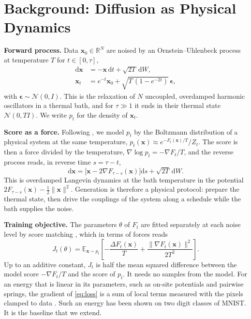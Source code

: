 \documentclass{article}
\newif\ifshownotes
\newcommand{\budget}[1]{\ifshownotes{\noindent\small\itshape\textcolor{notegray}{[Budget: #1]}\par}\fi}
\newcommand{\x}{\bm{x}}
\newcommand{\dd}{\mathrm{d}}
\begin{document}
\section{Background: Diffusion as Physical Dynamics}
\label{sec:background}
\budget{0.5 page}

\textbf{Forward process.}
Data $\x_0\in\mathbb{R}^{N}$ are noised by an Ornstein--Uhlenbeck process at
temperature $T$ for $t\in[0,\tau]$,
\begin{align}
  \dd\x &= -\x\,\dd t + \sqrt{2T}\,\dd W , \nonumber\\
  \x_t &= e^{-t}\x_0 + \sqrt{T\,(1-e^{-2t})}\,\bm{\epsilon} ,
  \label{eq:forward}
\end{align}
with $\bm{\epsilon}\sim\mathcal{N}(0,I)$. This is the relaxation of $N$
uncoupled, overdamped harmonic oscillators in a thermal bath, and for
$\tau\gg1$ it ends in their thermal state $\mathcal{N}(0,TI)$. We write $p_t$
for the density of $\x_t$.

\textbf{Score as a force.}
Following \citet{firstpaper2025}, we model $p_t$ by the Boltzmann distribution
of a physical system at the same temperature,
$p_t(\x)\approx e^{-F_t(\x)/T}/Z_t$. The score is then a force divided by the
temperature, $\nabla\log p_t=-\nabla F_t/T$, and the reverse process
\citep{song2021score} reads, in reverse time $s=\tau-t$,
\begin{equation}
  \dd\x = \bigl[\x - 2\nabla F_{\tau-s}(\x)\bigr]\dd s + \sqrt{2T}\,\dd W .
  \label{eq:reverse}
\end{equation}
This is overdamped Langevin dynamics at the bath temperature in the potential
$2F_{\tau-s}(\x)-\tfrac12\lVert\x\rVert^{2}$. Generation is therefore a
physical protocol: prepare the thermal state, then drive the couplings of the
system along a schedule while the bath supplies the noise.

\textbf{Training objective.}
The parameters $\theta$ of $F_t$ are fitted separately at each noise level by
score matching \citep{hyvarinen2005estimation}, which in terms of forces reads
\begin{equation}
  J_t(\theta) = \mathbb{E}_{\x\sim p_t}\!\left[
     -\frac{\Delta F_t(\x)}{T} + \frac{\lVert\nabla F_t(\x)\rVert^{2}}{2T^{2}}
  \right] .
  \label{eq:loss}
\end{equation}
Up to an additive constant, $J_t$ is half the mean squared difference between
the model score $-\nabla F_t/T$ and the score of $p_t$. It needs no samples
from the model. For an energy that is linear in its parameters, such as
on-site potentials and pairwise springs, the gradient of \eqref{eq:loss} is a
sum of local terms measured with the pixels clamped to data
\citep{firstpaper2025}. Such an energy has been shown on two digit classes of
MNIST. It is the baseline that we extend.
\end{document}

